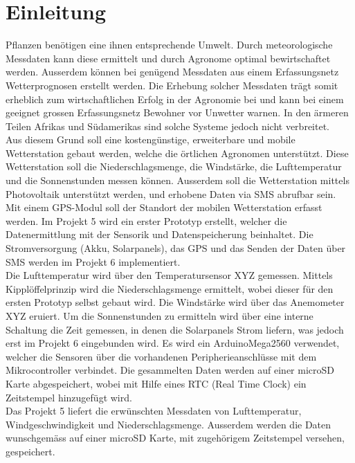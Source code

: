 \section{Einleitung}
Pflanzen benötigen eine ihnen entsprechende Umwelt. Durch meteorologische Messdaten kann diese ermittelt und durch Agronome optimal bewirtschaftet werden. Ausserdem können bei genügend Messdaten aus einem Erfassungsnetz Wetterprognosen erstellt werden. Die Erhebung solcher Messdaten trägt somit erheblich zum wirtschaftlichen Erfolg in der Agronomie bei und kann bei einem geeignet grossen Erfassungsnetz Bewohner vor Unwetter warnen. In den ärmeren Teilen Afrikas und Südamerikas sind solche Systeme jedoch nicht verbreitet.\\[0.5cm]
Aus diesem Grund soll eine kostengünstige, erweiterbare und mobile Wetterstation gebaut werden, welche die örtlichen Agronomen unterstützt. Diese Wetterstation soll die Niederschlagsmenge, die Windstärke, die Lufttemperatur und die Sonnenstunden messen können. Ausserdem soll die Wetterstation mittels Photovoltaik unterstützt werden, und erhobene Daten via SMS abrufbar sein. Mit einem GPS-Modul soll der Standort der mobilen Wetterstation erfasst werden. Im Projekt 5 wird ein erster Prototyp erstellt, welcher die Datenermittlung mit der Sensorik und Datenspeicherung beinhaltet. Die Stromversorgung (Akku, Solarpanels), das GPS und das Senden der Daten über SMS werden im Projekt 6 implementiert.\\[0.5cm]
Die Lufttemperatur wird über den Temperatursensor XYZ gemessen. Mittels Kipplöffelprinzip wird die Niederschlagsmenge ermittelt, wobei dieser für den ersten Prototyp selbst gebaut wird. Die Windstärke wird über das Anemometer XYZ eruiert. Um die Sonnenstunden zu ermitteln wird über eine interne Schaltung die Zeit gemessen, in denen die Solarpanels Strom liefern, was jedoch erst im Projekt 6 eingebunden wird. Es wird ein ArduinoMega2560 verwendet, welcher die Sensoren über die vorhandenen Peripherieanschlüsse mit dem Mikrocontroller verbindet. Die gesammelten Daten werden auf einer microSD Karte abgespeichert, wobei mit Hilfe eines RTC (Real Time Clock) ein Zeitstempel hinzugefügt wird.\\[0.5cm]
Das Projekt 5 liefert die erwünschten Messdaten von Lufttemperatur, Windgeschwindigkeit und Niederschlagsmenge. Ausserdem werden die Daten wunschgemäss auf einer microSD Karte, mit zugehörigem Zeitstempel versehen, gespeichert.

